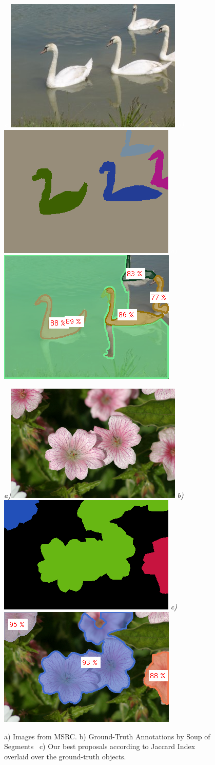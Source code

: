 \begin{figure}[!ht]

{\footnotesize\textit{\textcolor{white}{a)}}}\includegraphics[width=0.31\linewidth]{figs/18_25_s_00.png}
{\footnotesize\textit{\textcolor{white}{a)}}}\includegraphics[width=0.31\linewidth]{figs/18_25_s_gt.png}
{\footnotesize\textit{\textcolor{white}{a)}}}\includegraphics[width=0.31\linewidth]{figs/18_25_s_mvf.png}

{\footnotesize\textit{\textcolor{black}{a)}}}\includegraphics[width=0.31\linewidth]{figs/10_12_s_00.png}
{\footnotesize\textit{\textcolor{black}{b)}}}\includegraphics[width=0.31\linewidth]{figs/10_12_s_gt.png}
{\footnotesize\textit{\textcolor{black}{c)}}}\includegraphics[width=0.31\linewidth]{figs/10_12_s_mvf.png}


\caption{a) Images from MSRC. b) Ground-Truth Annotations by Soup of Segments~\cite{malisiewicz:bmvc07} c) Our best proposals according to Jaccard Index overlaid over the ground-truth objects. }
 \label{fig:msrc_examples}
 \end{figure}
